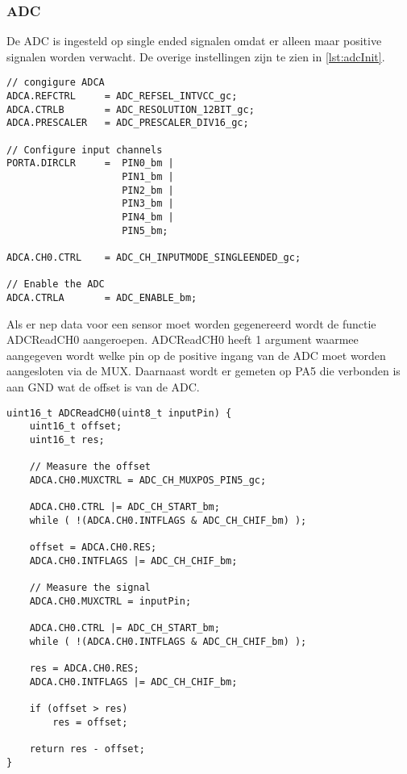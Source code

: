 \subsubsection{ADC}
De ADC is ingesteld op single ended signalen omdat er alleen maar positive signalen worden verwacht. De overige instellingen zijn te zien in \autoref{lst:adcInit}.
\begin{lstlisting}[caption={ADC init},captionpos=b,label={lst:adcInit},style=c]
// congigure ADCA
ADCA.REFCTRL     = ADC_REFSEL_INTVCC_gc;
ADCA.CTRLB       = ADC_RESOLUTION_12BIT_gc;            
ADCA.PRESCALER   = ADC_PRESCALER_DIV16_gc;

// Configure input channels
PORTA.DIRCLR     =  PIN0_bm |
                    PIN1_bm |
                    PIN2_bm | 
                    PIN3_bm |
                    PIN4_bm |
                    PIN5_bm;

ADCA.CH0.CTRL    = ADC_CH_INPUTMODE_SINGLEENDED_gc;

// Enable the ADC
ADCA.CTRLA       = ADC_ENABLE_bm;
\end{lstlisting}
Als er nep data voor een sensor moet worden gegenereerd wordt de functie ADCReadCH0 aangeroepen. ADCReadCH0 heeft 1 argument waarmee aangegeven wordt welke pin op de positive ingang van de ADC moet worden aangesloten via de MUX. Daarnaast wordt er gemeten op PA5 die verbonden is aan GND wat de offset is van de ADC. 
\begin{lstlisting}[caption={ADCReadCH0},captionpos=b,label={lst:ADCReadCH0},style=c]
uint16_t ADCReadCH0(uint8_t inputPin) { 
    uint16_t offset;                                  
    uint16_t res;

    // Measure the offset
    ADCA.CH0.MUXCTRL = ADC_CH_MUXPOS_PIN5_gc;

    ADCA.CH0.CTRL |= ADC_CH_START_bm;
    while ( !(ADCA.CH0.INTFLAGS & ADC_CH_CHIF_bm) );
    
    offset = ADCA.CH0.RES;
    ADCA.CH0.INTFLAGS |= ADC_CH_CHIF_bm;

    // Measure the signal
    ADCA.CH0.MUXCTRL = inputPin;

    ADCA.CH0.CTRL |= ADC_CH_START_bm;
    while ( !(ADCA.CH0.INTFLAGS & ADC_CH_CHIF_bm) );

    res = ADCA.CH0.RES;
    ADCA.CH0.INTFLAGS |= ADC_CH_CHIF_bm;

    if (offset > res)
        res = offset;

    return res - offset;
}
\end{lstlisting}

